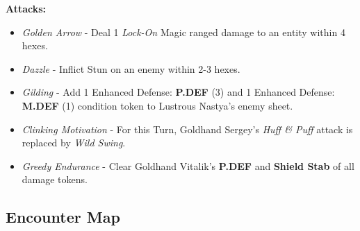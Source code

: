 \textbf{Attacks:}
\begin{itemize}
\item \emph{Golden Arrow} -  Deal 1 \emph{Lock-On} Magic ranged damage to an entity within 4 hexes.
\item \emph{Dazzle} - Inflict Stun on an enemy within 2-3 hexes.
\item \emph{Gilding} - Add 1 Enhanced Defense: \textbf{P.DEF} (3) and 1 Enhanced Defense: \textbf{M.DEF} (1) condition token to Lustrous Nastya’s enemy sheet.
\item \emph{Clinking Motivation} - For this Turn, Goldhand Sergey’s \emph{Huff \& Puff} attack is replaced by \emph{Wild Swing}.
\item \emph{Greedy Endurance} - Clear Goldhand Vitalik’s \textbf{P.DEF} and \textbf{Shield Stab} of all damage tokens. 
\end{itemize}

\pagebreak

\subsection*{Encounter Map}
\begin{center}
\end{center}

